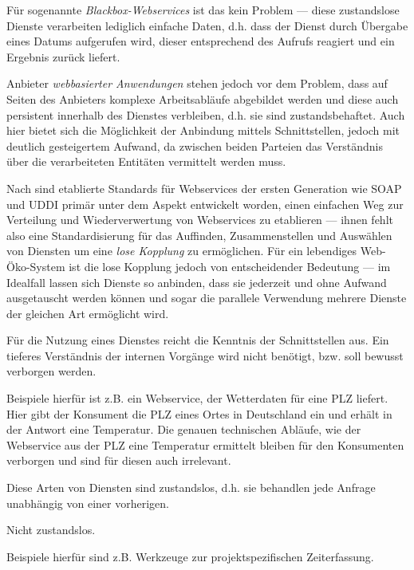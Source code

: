 \documentclass[10pt,a4paper]{article}
\begin{document}
Für sogenannte \emph{Blackbox-Webservices} ist das kein Problem --- diese zustandslose Dienste verarbeiten lediglich einfache Daten, d.h. dass der Dienst durch Übergabe eines Datums aufgerufen wird, dieser entsprechend des Aufrufs reagiert und ein Ergebnis zurück liefert.

Anbieter \emph{webbasierter Anwendungen} stehen jedoch vor dem Problem, dass auf Seiten des Anbieters komplexe Arbeitsabläufe abgebildet werden und diese auch persistent innerhalb des Dienstes verbleiben, d.h. sie sind zustandsbehaftet. Auch hier bietet sich die Möglichkeit der Anbindung mittels Schnittstellen, jedoch mit deutlich gesteigertem Aufwand, da zwischen beiden Parteien das Verständnis über die verarbeiteten Entitäten vermittelt werden muss. 

Nach \cite[Seite 653]{ei-sawsdl} sind etablierte Standards für Webservices der ersten Generation wie \ac{SOAP} und \ac{UDDI} primär unter dem Aspekt entwickelt worden, einen einfachen Weg zur Verteilung und Wiederverwertung von Webservices zu etablieren --- ihnen fehlt also eine Standardisierung für das Auffinden, Zusammenstellen und Auswählen von Diensten um eine \emph{lose Kopplung} zu ermöglichen. Für ein lebendiges Web-Öko-System ist die lose Kopplung jedoch von entscheidender Bedeutung --- im Idealfall lassen sich Dienste so anbinden, dass sie jederzeit und ohne Aufwand ausgetauscht werden können und sogar die parallele Verwendung mehrere Dienste der gleichen Art ermöglicht wird.


Für die Nutzung eines Dienstes reicht die Kenntnis der Schnittstellen aus. Ein tieferes Verständnis
der internen Vorgänge wird nicht benötigt, bzw. soll bewusst verborgen werden. \cite{hhxmlwssoa}

Beispiele hierfür ist z.B. ein Webservice, der Wetterdaten für eine PLZ liefert. Hier gibt der Konsument die PLZ eines Ortes in Deutschland ein und erhält in der Antwort eine Temperatur. Die genauen technischen Abläufe, wie der Webservice aus der PLZ eine Temperatur ermittelt bleiben für den Konsumenten verborgen und sind für diesen auch irrelevant.

Diese Arten von Diensten sind zustandslos, d.h. sie behandlen jede Anfrage unabhängig von einer vorherigen.


Nicht zustandslos.

Beispiele hierfür sind z.B. Werkzeuge zur projektspezifischen Zeiterfassung. 
\end{document}
